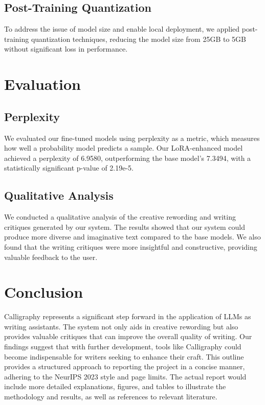 \documentclass{article}
\begin{document}
\subsection{Post-Training Quantization}

To address the issue of model size and enable local deployment, we applied post-training quantization techniques, reducing the model size from 25GB to 5GB without significant loss in performance.


\section{Evaluation}
\label{eval}

\subsection{Perplexity}

We evaluated our fine-tuned models using perplexity as a metric, which measures how well a probability model predicts a sample. Our LoRA-enhanced model achieved a perplexity of 6.9580, outperforming the base model's 7.3494, with a statistically significant p-value of 2.19e-5.

\subsection{Qualitative Analysis}

We conducted a qualitative analysis of the creative rewording and writing critiques generated by our system. The results showed that our system could produce more diverse and imaginative text compared to the base models. We also found that the writing critiques were more insightful and constructive, providing valuable feedback to the user.


\section{Conclusion}
\label{conclusion}


Calligraphy represents a significant step forward in the application of LLMs as writing assistants. The system not only aids in creative rewording but also provides valuable critiques that can improve the overall quality of writing. Our findings suggest that with further development, tools like Calligraphy could become indispensable for writers seeking to enhance their craft. This outline provides a structured approach to reporting the project in a concise manner, adhering to the NeurIPS 2023 style and page limits. The actual report would include more detailed explanations, figures, and tables to illustrate the methodology and results, as well as references to relevant literature.
\end{document}
